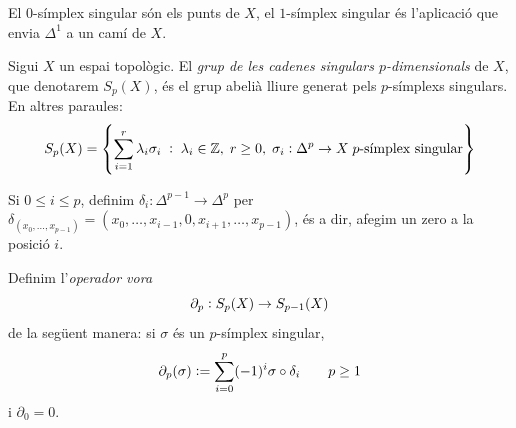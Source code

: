 \documentclass[../main.tex]{subfiles}
\begin{document}
\begin{ej}
El $0$-símplex singular són els punts de $X$, el $1$-símplex singular és l'aplicació que envia $\Delta^1$ a un camí de $X$.
\end{ej}

\begin{defi}
Sigui $X$ un espai topològic. El \textit{grup de les cadenes singulars $p$-dimensionals} de $X$, que denotarem $S_p(X)$, és el grup abelià lliure generat pels $p$-símplexs singulars. En altres paraules:
\begin{equation}
    \notag
    S_p(X) = \left\{\sum_{i=1}^r\lambda_i\sigma_i\;:\;\lambda_i\in\mathbb{Z},\;r\geq 0,\;\sigma_i:\Delta^p\rightarrow X\;\text{$p$-símplex singular}\right\}
\end{equation}
\end{defi}

Si $0\leq i\leq p$, definim $\delta_i:\Delta^{p-1}\rightarrow\Delta^p$ per $\delta_(x_0,\ldots,x_{p-1}) = (x_0,\ldots,x_{i-1},0,x_{i+1},\ldots,x_{p-1})$, és a dir, afegim un zero a la posició $i$.

\begin{defi} Definim l'\textit{operador vora}
\begin{equation}
    \notag
    \partial_p:S_p(X)\rightarrow S_{p-1}(X)
\end{equation}
de la següent manera: si $\sigma$ és un $p$-símplex singular,
\begin{equation}
    \notag
    \partial_p(\sigma) :=\sum_{i=0}^p(-1)^{i}\sigma\circ\delta_i\qquad p\geq 1
\end{equation}
i $\partial_0 = 0$.
\end{defi}
\end{document}
